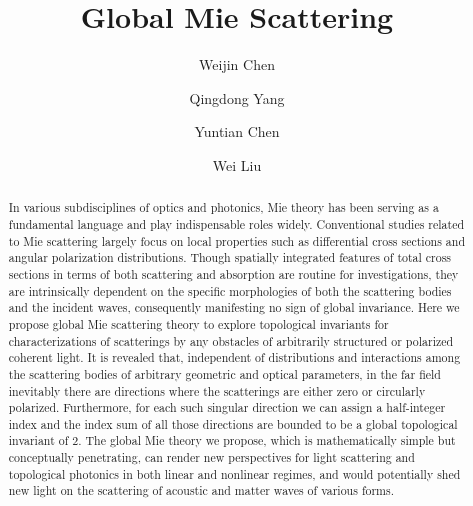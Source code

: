 \documentclass[aps,twocolumn,superscriptaddress]{revtex4-1}
\begin{document}


\title{Global Mie Scattering}


\author{Weijin Chen}
\author{Qingdong Yang}
\author{Yuntian Chen}
\author{Wei Liu}

\begin{abstract}
In various subdisciplines of optics and photonics, Mie theory has been serving as a fundamental language and play indispensable roles widely. Conventional studies related to Mie scattering largely focus on local properties such as differential cross sections and angular polarization distributions. Though  spatially integrated  features of total cross sections in terms of both scattering and absorption are routine for investigations, they are intrinsically dependent on the specific morphologies of both the scattering bodies and the incident waves, consequently manifesting no sign of global invariance. Here we propose global Mie scattering theory to explore topological invariants for characterizations of scatterings by any obstacles of arbitrarily structured or polarized coherent light. It is revealed that, independent of distributions and interactions among the scattering bodies of arbitrary geometric and optical parameters, in the far field inevitably there are directions where the scatterings are either zero or circularly polarized.  Furthermore, for each such singular direction we can assign a half-integer index and the index sum of all those directions are bounded to be a global topological invariant of $2$.  The global Mie theory we propose, which is mathematically simple but conceptually penetrating, can render new perspectives for light scattering and topological photonics in both linear and nonlinear regimes, and would potentially shed new light on the scattering of acoustic and matter waves of various forms.
\end{abstract}
\end{document}
